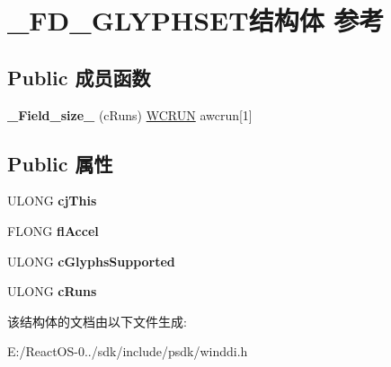 \hypertarget{struct___f_d___g_l_y_p_h_s_e_t}{}\section{\+\_\+\+F\+D\+\_\+\+G\+L\+Y\+P\+H\+S\+E\+T结构体 参考}
\label{struct___f_d___g_l_y_p_h_s_e_t}
\subsection*{Public 成员函数}
\begin{DoxyCompactItemize}
\item 
\mbox{\label{struct___f_d___g_l_y_p_h_s_e_t_a5bd3969507bf8d380f31c91c479c52d7}} 
{\bfseries \+\_\+\+Field\+\_\+size\+\_\+} (c\+Runs) \hyperlink{struct___w_c_r_u_n}{W\+C\+R\+UN} awcrun\mbox{[}1\mbox{]}
\end{DoxyCompactItemize}
\subsection*{Public 属性}
\begin{DoxyCompactItemize}
\item 
\mbox{\label{struct___f_d___g_l_y_p_h_s_e_t_a3ef078fc8106af48d5867a441a0e6562}} 
U\+L\+O\+NG {\bfseries cj\+This}
\item 
\mbox{\label{struct___f_d___g_l_y_p_h_s_e_t_aa35b86a483c12c03165c1c8769e94c57}} 
F\+L\+O\+NG {\bfseries fl\+Accel}
\item 
\mbox{\label{struct___f_d___g_l_y_p_h_s_e_t_a6f3c2cfe1e5a9feb1d85161a4c02cce5}} 
U\+L\+O\+NG {\bfseries c\+Glyphs\+Supported}
\item 
\mbox{\label{struct___f_d___g_l_y_p_h_s_e_t_a62f5752889d658ddb1631b5309de68bc}} 
U\+L\+O\+NG {\bfseries c\+Runs}
\end{DoxyCompactItemize}


该结构体的文档由以下文件生成\+:\begin{DoxyCompactItemize}
\item 
E\+:/\+React\+O\+S-\/0../sdk/include/psdk/winddi.\+h\end{DoxyCompactItemize}
